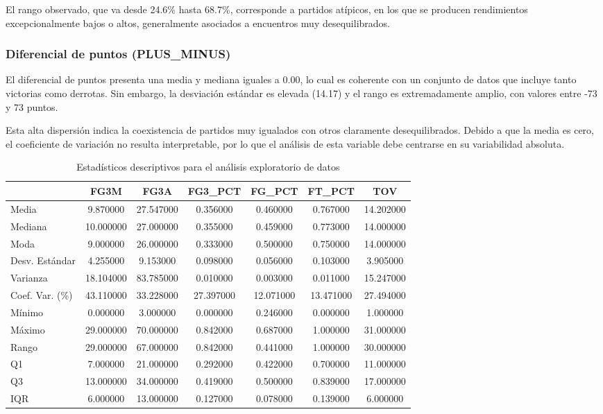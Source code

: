 \documentclass[12pt]{article}
\begin{document}
El rango observado, que va desde 24.6\% hasta 68.7\%, corresponde a partidos atípicos, en los
que se producen rendimientos excepcionalmente bajos o altos, generalmente asociados a
encuentros muy desequilibrados.

\subsubsection*{Diferencial de puntos (PLUS\_MINUS)}

El diferencial de puntos presenta una media y mediana iguales a 0.00, lo cual es coherente con un
conjunto de datos que incluye tanto victorias como derrotas. Sin embargo, la desviación estándar
es elevada (14.17) y el rango es extremadamente amplio, con valores entre -73 y 73 puntos.

Esta alta dispersión indica la coexistencia de partidos muy igualados con otros claramente
desequilibrados. Debido a que la media es cero, el coeficiente de variación no resulta interpretable,
por lo que el análisis de esta variable debe centrarse en su variabilidad absoluta.


\begin{table}[H]
\caption{Estadísticos descriptivos para el análisis exploratorio de datos}
\label{tab:estadisticos_descriptivos_eda1}
\begin{tabular}{|l|c|c|c|c|c|c|}
\toprule
 & FG3M & FG3A & FG3\_PCT & FG\_PCT & FT\_PCT & TOV \\
\midrule
Media & 9.870000 & 27.547000 & 0.356000 & 0.460000 & 0.767000 & 14.202000 \\
Mediana & 10.000000 & 27.000000 & 0.355000 & 0.459000 & 0.773000 & 14.000000 \\
Moda & 9.000000 & 26.000000 & 0.333000 & 0.500000 & 0.750000 & 14.000000 \\
Desv. Estándar & 4.255000 & 9.153000 & 0.098000 & 0.056000 & 0.103000 & 3.905000 \\
Varianza & 18.104000 & 83.785000 & 0.010000 & 0.003000 & 0.011000 & 15.247000 \\
Coef. Var. (\%) & 43.110000 & 33.228000 & 27.397000 & 12.071000 & 13.471000 & 27.494000 \\
Mínimo & 0.000000 & 3.000000 & 0.000000 & 0.246000 & 0.000000 & 1.000000 \\
Máximo & 29.000000 & 70.000000 & 0.842000 & 0.687000 & 1.000000 & 31.000000 \\
Rango & 29.000000 & 67.000000 & 0.842000 & 0.441000 & 1.000000 & 30.000000 \\
Q1 & 7.000000 & 21.000000 & 0.292000 & 0.422000 & 0.700000 & 11.000000 \\
Q3 & 13.000000 & 34.000000 & 0.419000 & 0.500000 & 0.839000 & 17.000000 \\
IQR & 6.000000 & 13.000000 & 0.127000 & 0.078000 & 0.139000 & 6.000000 \\
\bottomrule
\end{tabular}
\end{table}
\end{document}
